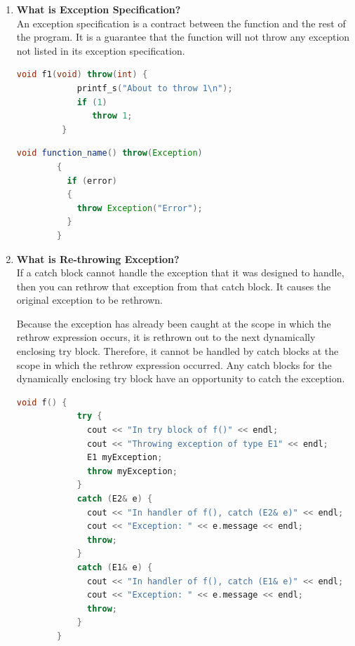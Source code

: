\documentclass[11pt]{article}
\begin{document}
\begin{enumerate}
	      \textbf{Example}
	      \begin{lstlisting}[language=C++]
		int a;
		try
		{
			cin>> a;
			if(a == 0)
			{
				throw a; // int is being thrown. 
			}
			else{
				cout<<33/a; 
				throw 'a'; // character is being thrown.  
			}
		}
		catch (int a)
		{
			cout<<"cant divide by zero;
		}
		catch (char a)
		{
			cout<<"A is not zero";
		}
	\end{lstlisting}
	      \begin{lstlisting}[language = Java]
		try {
            withdrawal_amt = input.nextInt();
            if (withdrawal_amt > amount) {
                throw new Exception("Withdrawal amount more than amount. ");
				new_amount = withdrawal_amt / amount;
            } else {
                amount -= withdrawal_amt;
            }
        } catch (Exception e) {
            System.out.println("Withdrawal Amount more than amount in bank. ");
            return 0;
        } catch (DivisionByZeroException d)
		{
			System.out.println(d);
		}
	\end{lstlisting}
	\item \textbf{What is Exception Specification?}\\
	      An exception specification is a contract between the function and the rest of the program. It is a guarantee that the function will not throw any exception not listed in its exception specification.
	      \begin{lstlisting}[language = C++]
		void f1(void) throw(int) {   
			printf_s("About to throw 1\n");   
			if (1)   
			   throw 1;   
		 }   
	\end{lstlisting}
	      \begin{lstlisting}[language=Java]
		void function_name() throw(Exception)
		{
		  if (error) 
		  {
			throw Exception("Error");
		  }
		}		
	\end{lstlisting}
	\item \textbf{What is Re-throwing Exception?}\\
	      If a catch block cannot handle the exception that it was designed to handle, then you can rethrow that exception from that catch block.
	      It causes the original exception to be rethrown.

	      Because the exception has already been caught at the scope in which the rethrow expression occurs, it is rethrown out to the next dynamically enclosing try block. Therefore, it cannot be handled by catch blocks at the scope in which the rethrow expression occurred. Any catch blocks for the dynamically enclosing try block have an opportunity to catch the exception.
	      \begin{lstlisting}[language=C++]
		void f() {
			try {
			  cout << "In try block of f()" << endl;
			  cout << "Throwing exception of type E1" << endl;
			  E1 myException;
			  throw myException;
			}
			catch (E2& e) {
			  cout << "In handler of f(), catch (E2& e)" << endl;
			  cout << "Exception: " << e.message << endl;
			  throw;
			}
			catch (E1& e) {
			  cout << "In handler of f(), catch (E1& e)" << endl;
			  cout << "Exception: " << e.message << endl;
			  throw;
			}	
		}
		

\end{lstlisting}
\end{enumerate}
\end{document}
